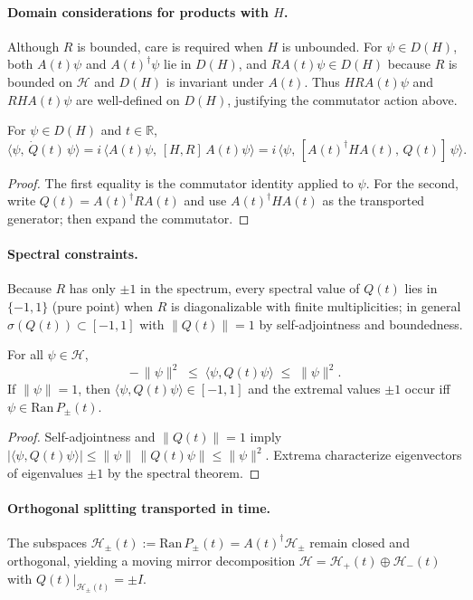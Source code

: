 \paragraph{Domain considerations for products with $H$.}
Although $R$ is bounded, care is required when $H$ is unbounded. For $\psi\in D(H)$,
both $A(t)\psi$ and $A(t)^\dagger\psi$ lie in $D(H)$, and $RA(t)\psi\in D(H)$ because $R$ is bounded on $\mathcal{H}$ and $D(H)$ is invariant under $A(t)$.
Thus $HR A(t)\psi$ and $RH A(t)\psi$ are well-defined on $D(H)$, justifying the commutator action above.

\begin{lemma}
For $\psi\in D(H)$ and $t\in\mathbb{R}$,
\[
\langle \psi,\, \dot Q(t)\, \psi\rangle
= i\,\langle A(t)\psi,\,[H,R]\,A(t)\psi\rangle
= i\,\langle \psi,\,[A(t)^\dagger H A(t),\,Q(t)]\,\psi\rangle.
\]
\end{lemma}

\begin{proof}
The first equality is the commutator identity applied to $\psi$.
For the second, write $Q(t)=A(t)^\dagger R A(t)$ and use $A(t)^\dagger H A(t)$ as the transported generator; then expand the commutator.
\end{proof}

\paragraph{Spectral constraints.}
Because $R$ has only $\pm1$ in the spectrum, every spectral value of $Q(t)$ lies in $\{-1,1\}$ (pure point) when $R$ is diagonalizable with finite multiplicities; in general $\sigma(Q(t))\subset[-1,1]$ with $\|Q(t)\|=1$ by self-adjointness and boundedness.

\begin{proposition}
For all $\psi\in\mathcal{H}$,
\[
-\,\|\psi\|^2 \;\le\; \langle \psi, Q(t)\psi\rangle \;\le\; \|\psi\|^2.
\]
If $\|\psi\|=1$, then $\langle \psi, Q(t)\psi\rangle\in[-1,1]$ and the extremal values $\pm1$ occur iff $\psi\in\mathrm{Ran}\,P_\pm(t)$.
\end{proposition}

\begin{proof}
Self-adjointness and $\|Q(t)\|=1$ imply $|\langle \psi, Q(t)\psi\rangle|\le \|\psi\|\,\|Q(t)\psi\|\le \|\psi\|^2$.
Extrema characterize eigenvectors of eigenvalues $\pm1$ by the spectral theorem.
\end{proof}

\paragraph{Orthogonal splitting transported in time.}
The subspaces $\mathcal{H}_\pm(t):=\mathrm{Ran}\,P_\pm(t)=A(t)^\dagger\mathcal{H}_\pm$ remain closed and orthogonal, yielding a moving mirror decomposition
$\mathcal{H}=\mathcal{H}_+(t)\oplus\mathcal{H}_-(t)$ with $Q(t)|_{\mathcal{H}_\pm(t)}=\pm I$.

